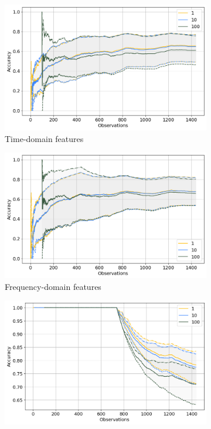 \begin{figure}[]
    \centering
    \begin{subfigure}[b]{0.48\textwidth}
        \includegraphics[width=\textwidth]{assets/results/incremental-learning/tumbling-TD.png}
        \caption{Time-domain features}
    \end{subfigure}
    \hfill
    \begin{subfigure}[b]{0.48\textwidth}
        \includegraphics[width=\textwidth]{assets/results/incremental-learning/tumbling-FD.png}
        \caption{Frequency-domain features}
    \end{subfigure}
    \hfill
    \begin{subfigure}[b]{0.48\textwidth}
        \includegraphics[width=\textwidth]{assets/results/incremental-learning/tumbling-TD-severity.png}

\end{subfigure}
\end{figure}

